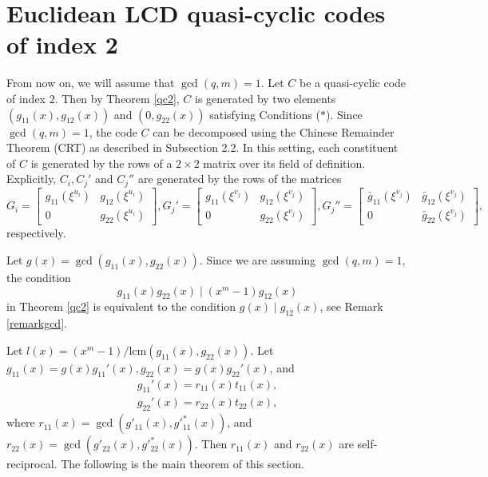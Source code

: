 \documentclass[a4paper,12pt]{article}
\begin{document}
\section{Euclidean LCD quasi-cyclic codes of index 2}
From now on, we will assume that $\gcd(q,m)=1$. Let $C$ be a quasi-cyclic code   of index $2$. Then by Theorem \ref{qc2}, $C$ is generated by two elements $(g_{11}(x), g_{12}(x))$ and $(0, g_{22}(x))$ satisfying Conditions ($\ast$).  Since $\gcd(q,m)=1$, the code $C$ can be decomposed using the Chinese Remainder Theorem (CRT) as described in Subsection 2.2. In this setting, each constituent of $C$ is generated by the rows of a $2 \times 2$ matrix over its field of definition. Explicitly, $C_i, C_j'$ and $C_j''$ are generated by the rows of the matrices
$$
G_i=  \begin{bmatrix}
g_{11}(\xi^{u_i}) & g_{12}(\xi^{u_i}) \\
0 & g_{22}(\xi^{u_i}) 
\end{bmatrix} ,
G_j'=   \begin{bmatrix}
g_{11}(\xi^{v_j}) & g_{12}(\xi^{v_j}) \\
0 & g_{22}(\xi^{v_j}) 
\end{bmatrix}  ,
G_j''=   \begin{bmatrix}
\bar{g}_{11}(\xi^{v_j}) & \bar{g}_{12}(\xi^{v_j}) \\
0 & \bar{g}_{22}(\xi^{v_j}) 
\end{bmatrix}  ,
$$
respectively. 



Let $g(x)= \gcd(g_{11}(x),g_{22}(x))$. Since we are assuming $\gcd(q,m)=1$, the condition 
$$g_{11}(x)g_{22}(x) \mid (x^m-1)g_{12}(x)$$ 
in Theorem \ref{qc2} is equivalent to the condition $g(x) \mid g_{12}(x)$, see Remark \ref{remarkgcd}. 





Let  $l(x)= (x^m-1)/\text{lcm}(g_{11}(x),g_{22}(x))$. Let $g_{11}(x)=g(x)   g_{11}'(x), g_{22}(x)=g(x) g_{22}'(x)$, and
\begin{align*}
g_{11}'(x)=r_{11}(x) t_{11}(x),\\
g_{22}'(x)=r_{22}(x) t_{22}(x),
\end{align*}
where $r_{11}(x)=\gcd(g'_{11}(x), g'^*_{11}(x))$, and $r_{22}(x)=\gcd(g'_{22}(x), g'^*_{22}(x))$. Then $r_{11}(x)$ and $r_{22}(x)$ are self-reciprocal. 
The following is the main theorem of this section. 
\end{document}
